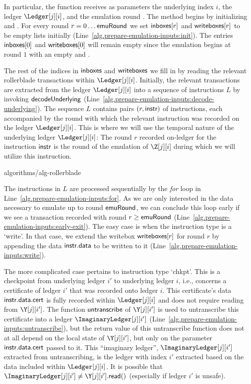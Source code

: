 In particular, the function \prepareEmulationInputs receives as parameters
the underlying index $i$, the ledger $\Ledger[j][i]$,
and the emulation round \emulationRound.
The method begins by initializing \inboxes and \writeboxes. For every round $r = 0 \ldots \textsf{emuRound}$ we set
$\textsf{inboxes}[r]$ and $\textsf{writeboxes}[r]$ to be empty lists initially (Line~\ref{alg.prepare-emulation-inputs:init}).
The entries $\textsf{inboxes}[0]$ and $\textsf{writeboxes}[0]$ will remain empty
since the emulation begins at round $1$ with an empty \inbox and \writebox.

The rest of the indices in $\textsf{inboxes}$
and $\textsf{writeboxes}$ we fill in by reading the relevant rollerblade transactions within $\Ledger[j][i]$.
Initially, the relevant transactions are extracted from the ledger $\Ledger[j][i]$ into a sequence
of instructions $L$ by invoking $\textsf{decodeUnderlying}$ (Line~\ref{alg.prepare-emulation-inputs:decode-underlying}).
The sequence $L$ contains pairs $(r, \textsf{instr})$ of instructions, each accompanied by the round with which
the relevant instruction was recorded on the ledger $\Ledger[j][i]$. This is where we will use the temporal
nature of the underlying ledger $\Ledger[j][i]$: The round $r$ recorded on-ledger for the instruction
$\textsf{instr}$ is the round of the emulation of $\Z[j][i]$ during which we will utilize this instruction.

{algorithms/alg-rollerblade}

The instructions in $L$ are processed sequentially by the \emph{for} loop in Line~\ref{alg.prepare-emulation-inputs:for}.
As we are only interested in the data necessary to emulate up to round $\textsf{emuRound}$, we can conclude this loop
early if we see a transaction recorded with round $r \geq \textsf{emuRound}$ (Line~\ref{alg.prepare-emulation-inputs:early-exit}).
The easy case is when the instruction type is a `write'. In that case, we extend the writebox $\textsf{writeboxes}[r]$
for round $r$ by appending the data $\textsf{instr}.\textsf{data}$ to be written to it (Line~\ref{alg.prepare-emulation-inputs:write}).

The more complicated case pertains to instruction type `chkpt'. This is a checkpoint from underlying
ledger $i'$ to underlying ledger $i$, i.e., concerns a certificate of ledger $i'$ that was recorded onto
ledger $i$. This certificate's data $\textsf{instr}.\textsf{data}.\textsf{cert}$ is fully recorded within $\Ledger[j][i]$
and does not require reading from $\Y[j][i']$. The function $\textsf{untranscribe}$ of $\Y[j][i']$ is used to untranscribe
this certificate into a ledger $\ImaginaryLedger[j][i']$ (Line~\ref{alg.prepare-emulation-inputs:untranscribe}),
but the return value of this untranscribe function does not at all depend on the local state of $\Y[j][i']$,
but only on the parameter $\textsf{instr}.\textsf{data}.\textsf{cert}$ passed to it. This ``imaginary ledger'',
$\ImaginaryLedger[j][i']$ extracted from untranscribing, is the ledger with index $i'$ extracted
based on the data included within $\Ledger[j][i]$. It is possible that
$\ImaginaryLedger[j][i'] \neq \Y[j][i'].\lread()$ (especially if ledger $i'$ is unsafe).

